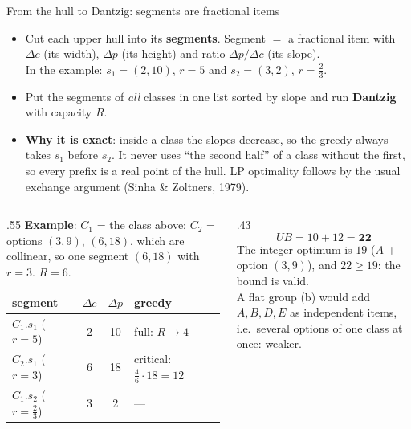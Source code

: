 \documentclass[aspectratio=169,11pt]{beamer}
\begin{document}
\begin{frame}{From the hull to Dantzig: segments are fractional items}
\footnotesize
\begin{itemize}\setlength\itemsep{2pt}
\item Cut each upper hull into its \textbf{segments}. Segment $=$ a fractional item with
  $\Delta c$ (its width), $\Delta p$ (its height) and ratio $\Delta p / \Delta c$ (its slope).\\
  In the example: $s_1 = (2, 10)$, $r{=}5$ and $s_2 = (3, 2)$, $r{=}\frac23$.
\item Put the segments of \emph{all} classes in one list sorted by slope and run \textbf{Dantzig} with capacity $R$.
\item \textbf{Why it is exact}: inside a class the slopes decrease, so the greedy always takes $s_1$ before $s_2$.
  It never uses ``the second half'' of a class without the first, so every prefix is a real point of the hull.
  LP optimality follows by the usual exchange argument (Sinha \& Zoltners, 1979).
\end{itemize}
\vspace{1mm}
\begin{columns}[T]
\begin{column}{.55\textwidth}
\textbf{Example}: $C_1$ = the class above; $C_2$ = options $(3,9)$, $(6,18)$, which are collinear, so one segment $(6,18)$ with $r{=}3$. $R = 6$.
\begin{center}
\begin{tabular}{lccl}\toprule
segment & $\Delta c$ & $\Delta p$ & greedy \\\midrule
$C_1.s_1$ ($r{=}5$) & 2 & 10 & full: $R \to 4$\\
$C_2.s_1$ ($r{=}3$) & 6 & 18 & critical: $\frac46 \cdot 18 = 12$\\
$C_1.s_2$ ($r{=}\frac23$) & 3 & 2 & ---\\\bottomrule
\end{tabular}
\end{center}
\end{column}
\begin{column}{.43\textwidth}
\[
UB = 10 + 12 = \mathbf{22}
\]
The integer optimum is $19$ ($A$ + option $(3,9)$), and $22 \ge 19$: the bound is valid.\\[2mm]
A flat group (b) would add $A, B, D, E$ as independent items, i.e.\ several options of one class at once: weaker.
\end{column}
\end{columns}
\end{frame}
\end{document}
